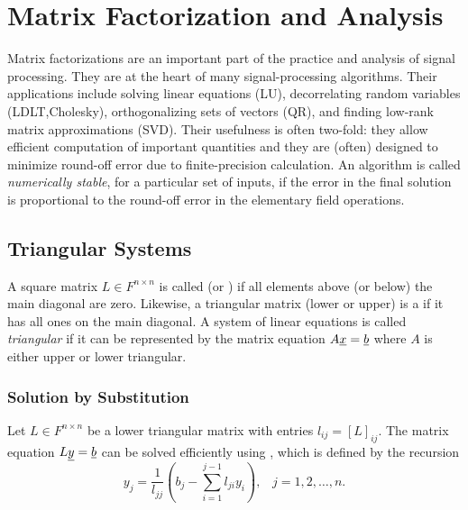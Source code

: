 \chapter{Matrix Factorization and Analysis}

Matrix factorizations are an important part of the practice and analysis of signal processing.
They are at the heart of many signal-processing algorithms. 
Their applications include solving linear equations (LU), decorrelating random variables (LDLT,Cholesky), orthogonalizing sets of vectors (QR), and finding low-rank matrix approximations (SVD).
Their usefulness is often two-fold: they allow efficient computation of important quantities and they are (often) designed to minimize round-off error due to finite-precision calculation.
An algorithm is called \emph{numerically stable}, for a particular set of inputs, if the error in the final solution is proportional to the round-off error in the elementary field operations.

\section{Triangular Systems}

A square matrix $L \in F^{n \times n}$ is called  (or ) if all elements above (or below) the main diagonal are zero.
Likewise, a triangular matrix (lower or upper) is a  if it has all ones on the main diagonal.
A system of linear equations is called \emph{triangular} if it can be represented by the matrix equation $A \underline{x} = \underline{b}$ where $A$ is either upper or lower triangular.

\subsection{Solution by Substitution}

Let $L \in F^{n \times n}$ be a lower triangular matrix with entries $l_{ij} = [ L ]_{ij}$.
The matrix equation $L \underline{y} = \underline{b}$ can be solved efficiently using , which is defined by the recursion
\begin{equation*}
y_j = \frac{1}{l_{jj}} \left( b_j - \sum_{i=1}^{j-1} l_{ji} y_i \right), \;\;\; j=1,2,\ldots,n.
\end{equation*}

